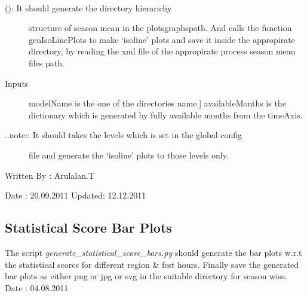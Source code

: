 \documentclass[letterpaper,10pt,english]{sphinxmanual}
\begin{document}

\begin{fulllineitems}
\label{diagnosis:generate_iso_plots.genSeasonMeanDirs}~\begin{description}
\item[{{\hyperref[diagnosis:generate_iso_plots.genSeasonMeanDirs]{}} (): It should generate the directory hierarichy}] \leavevmode
structure of season mean in the plotsgraphspath. And calls the
function genIsoLinePlots to make `isoline' plots and save it inside the
appropirate directory, by reading the xml file of the appropirate
process season mean files path.

\item[{Inputs}] \leavevmode{[}modelName is the one of the directories name.{]}
availableMonths is the dictionary which is generated by fully
available months from the timeAxis.

\item[{..note:: It should takes the levels which is set in the global config}] \leavevmode
file and generate the `isoline' plots to those levels only.

\end{description}

Written By : Arulalan.T

Date : 20.09.2011
Updated: 12.12.2011

\end{fulllineitems}



\subsection{Statistical Score Bar Plots}
\label{diagnosis:statistical-score-bar-plots}
The script \emph{generate\_statistical\_score\_bars.py} should generate the bar plots w.r.t the statistical scores for different region \& fcst hours.
Finally save the generated bar plots as either png or jpg or svg in the suitable directory for season wise.
\label{diagnosis:module-generate_statistical_score_bars}\label{diagnosis:module-generate_statistical_score_bars.py}
Date : 04.08.2011
\end{document}
